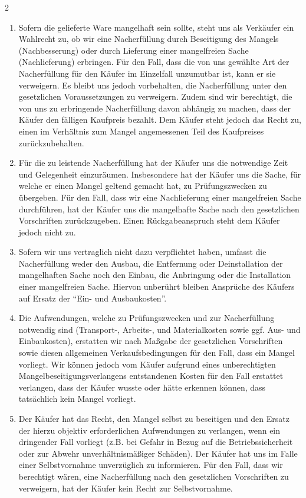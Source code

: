 \documentclass[%
    a4paper,%
    10pt,
]{scrartcl}
\begin{document}
\begin{multicols}{2}
\begin{enumerate}
\begin{enumerate}
             \item \label{ref:nacherfuellung}Sofern die gelieferte Ware mangelhaft sein sollte, steht uns als Verkäufer ein Wahlrecht zu, ob wir eine Nacherfüllung durch Beseitigung des Mangels (Nachbesserung) oder durch Lieferung einer mangelfreien Sache (Nachlieferung) erbringen. Für den Fall, dass die von uns gewählte Art der Nacherfüllung für den Käufer im Einzelfall unzumutbar ist, kann er sie verweigern. Es bleibt uns jedoch vorbehalten, die Nacherfüllung unter den gesetzlichen Voraussetzungen zu verweigern. Zudem sind wir berechtigt, die von uns zu erbringende Nacherfüllung davon abhängig zu machen, dass der Käufer den fälligen Kaufpreis bezahlt. Dem Käufer steht jedoch das Recht zu, einen im Verhältnis zum Mangel angemessenen Teil des Kaufpreises zurückzubehalten.
             \vfill\null
             \columnbreak
             \item Für die zu leistende Nacherfüllung hat der Käufer uns die notwendige Zeit und Gelegenheit einzuräumen. Insbesondere hat der Käufer uns die Sache, für welche er einen Mangel geltend gemacht hat, zu Prüfungszwecken zu übergeben. Für den Fall, dass wir eine Nachlieferung einer mangelfreien Sache durchführen, hat der Käufer uns die mangelhafte Sache nach den gesetzlichen Vorschriften zurückzugeben. Einen Rückgabeanspruch steht dem Käufer jedoch nicht zu.
             \item Sofern wir uns vertraglich nicht dazu verpflichtet haben, umfasst die Nacherfüllung weder den Ausbau, die Entfernung oder Deinstallation der mangelhaften Sache noch den Einbau, die Anbringung oder die Installation einer mangelfreien Sache. Hiervon unberührt bleiben Ansprüche des Käufers auf Ersatz der \enquote{Ein- und Ausbaukosten}.
             \item Die Aufwendungen, welche zu Prüfungszwecken und zur Nacherfüllung notwendig sind (Transport-, Arbeits-, und Materialkosten sowie ggf. Aus- und Einbaukosten), erstatten wir nach Maßgabe der gesetzlichen Vorschriften sowie diesen allgemeinen Verkaufsbedingungen für den Fall, dass ein Mangel vorliegt. Wir können jedoch vom Käufer aufgrund eines unberechtigten Mangelbeseitigungsverlangens entstandenen Kosten für den Fall erstattet verlangen, dass der Käufer wusste oder hätte erkennen können, dass tatsächlich kein Mangel vorliegt.
             \item Der Käufer hat das Recht, den Mangel selbst zu beseitigen und den Ersatz der hierzu objektiv erforderlichen Aufwendungen zu verlangen, wenn ein dringender Fall vorliegt (z.B. bei Gefahr in Bezug auf die Betriebssicherheit oder zur Abwehr unverhältnismäßiger Schäden). Der Käufer hat uns im Falle einer Selbstvornahme unverzüglich zu informieren. Für den Fall, dass wir berechtigt wären, eine Nacherfüllung nach den gesetzlichen Vorschriften zu verweigern, hat der Käufer kein Recht zur Selbstvornahme.

\end{enumerate}
\end{enumerate}
\end{multicols}
\end{document}
